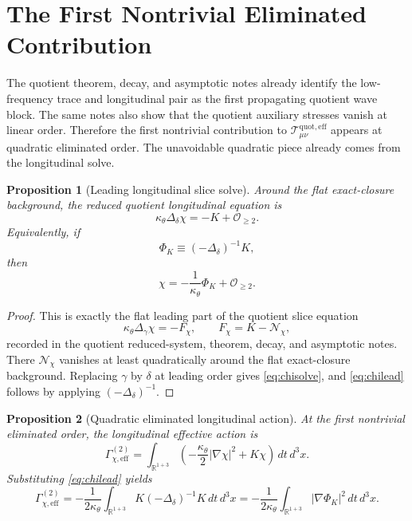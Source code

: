 \documentclass[11pt]{article}
\newcommand{\EffAux}{\mathcal T_{\mu\nu}^{\mathrm{quot,eff}}}
\newtheorem{proposition}{Proposition}
\begin{document}
\section{The First Nontrivial Eliminated Contribution}

The quotient theorem, decay, and asymptotic notes already identify the low-frequency trace and longitudinal pair as the first propagating quotient wave block. The same notes also show that the quotient auxiliary stresses vanish at linear order. Therefore the first nontrivial contribution to \(\EffAux\) appears at quadratic eliminated order. The unavoidable quadratic piece already comes from the longitudinal solve.

\begin{proposition}[Leading longitudinal slice solve]
\label{prop:chisolve}
Around the flat exact-closure background, the reduced quotient longitudinal equation is
\begin{equation}
\kappa_\theta\Delta_\delta\chi
=
-K+\mathcal O_{\ge 2}.
\label{eq:chisolve}
\end{equation}
Equivalently, if
\begin{equation}
\Phi_K\equiv(-\Delta_\delta)^{-1}K,
\label{eq:PhiK}
\end{equation}
then
\begin{equation}
\chi
=
-\frac{1}{\kappa_\theta}\Phi_K+\mathcal O_{\ge 2}.
\label{eq:chilead}
\end{equation}
\end{proposition}

\begin{proof}
This is exactly the flat leading part of the quotient slice equation
\[
\kappa_\theta\Delta_\gamma\chi=-F_\chi,
\qquad
F_\chi=K-\mathcal N_\chi,
\]
recorded in the quotient reduced-system, theorem, decay, and asymptotic notes. There \(\mathcal N_\chi\) vanishes at least quadratically around the flat exact-closure background. Replacing \(\gamma\) by \(\delta\) at leading order gives \eqref{eq:chisolve}, and \eqref{eq:chilead} follows by applying \((-\Delta_\delta)^{-1}\).
\end{proof}

\begin{proposition}[Quadratic eliminated longitudinal action]
\label{prop:Gammachi}
At the first nontrivial eliminated order, the longitudinal effective action is
\begin{equation}
\Gamma_{\chi,\mathrm{eff}}^{(2)}
=
\int_{\mathbb R^{1+3}}
\left(
-\frac{\kappa_\theta}{2}|\nabla\chi|^2
+K\chi
\right)\,dt\,d^3x.
\label{eq:Gammachi0}
\end{equation}
Substituting \eqref{eq:chilead} yields
\begin{equation}
\Gamma_{\chi,\mathrm{eff}}^{(2)}
=
-\frac{1}{2\kappa_\theta}
\int_{\mathbb R^{1+3}}
K(-\Delta_\delta)^{-1}K\,dt\,d^3x
=
-\frac{1}{2\kappa_\theta}
\int_{\mathbb R^{1+3}}
|\nabla\Phi_K|^2\,dt\,d^3x.
\label{eq:Gammachi}
\end{equation}
\end{proposition}
\end{document}
